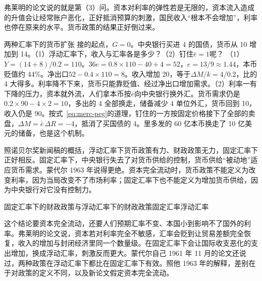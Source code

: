 弗莱明的论文说的就是第（3）问。资本对利率的弹性若是无限的，资本流入造成的升值会让经常账户恶化，正好抵消预算的刺激，国民收入“根本不会增加”，利率也停在原来的水平\cite{fleming1962}。货币政策的结果正好倒过来。

\begin{example}{两种汇率下的货币扩张}\label{ex:mundell-money}
接的起点，$G=0$。中央银行买进 4 的国债，货币从 10 增加到 14。（1）浮动汇率下，收入与汇率各是多少？（2）钉住$\bar e=1$呢？
\solution
（1）$Y=(14+8)/0.2=110$。$36e=0.8\times110-40+4=52$，$e=13/9\approx1.44$，本币贬值约 44\%。净出口$52-0.4\times110=8$。收入增加 20，等于$\Delta M/k=4/0.2$，比的 4 大得多。利率降不下来，货币只能靠贬值、经过净出口增加需求。（2）利率一有下降的压力，资本就外流，人们拿本币按$\bar e$向中央银行换外汇。货币需求仍是$0.2\times90-4\times2=10$，多出的 4 全部换走，储备减少 4 单位外汇，货币回到 10，收入仍是 90。按式~\eqref{eq:merc-peg}的道理，钉住的一方按固定价格接下了全部的卖盘，$\Delta M=\bar e\,\Delta R=-4$，抵消了买国债的 4。里多发的 60 亿本币换走了 10 亿美元的储备，也是这个机制。
\end{example}

照诺贝尔奖新闻稿的概括，浮动汇率下货币政策有力、财政政策无力，固定汇率下正好相反\cite{nobel1999}。固定汇率下，中央银行失去了对货币供给的控制，货币供给“被动地”适应货币需求\cite{nobel1999}。蒙代尔 1963 年说得更绝。资本完全流动时，货币政策不能定义为改变利率，因为当局改变不了市场利率；固定汇率下也不能定义为增加货币供给，因为中央银行对它没有控制力\cite{mundell1963}。

\begin{compare}{固定汇率下的财政政策与浮动汇率下的财政政策}{固定汇率}{浮动汇率}
\end{compare}

\begin{pitfall}
这个结论要资本完全流动，还要人们预期汇率不变、本国小到影响不了国外的利率。弗莱明的论文说，资本若对利率完全不敏感，汇率会贬到让贸易差额完全恢复，收入的增加与封闭经济里同一个数量级\cite{fleming1962}。在固定汇率下会让国际收支恶化的支出增加，换成浮动汇率，刺激反而更大\cite{fleming1962}。蒙代尔自己 1961 年 11 月的论文还说过，两种政策在浮动汇率下都比在固定汇率下有效。照他 1963 年的解释，差别在于对政策的定义不同，以及新论文假定资本完全流动\cite{mundell1963}。
\end{pitfall}

